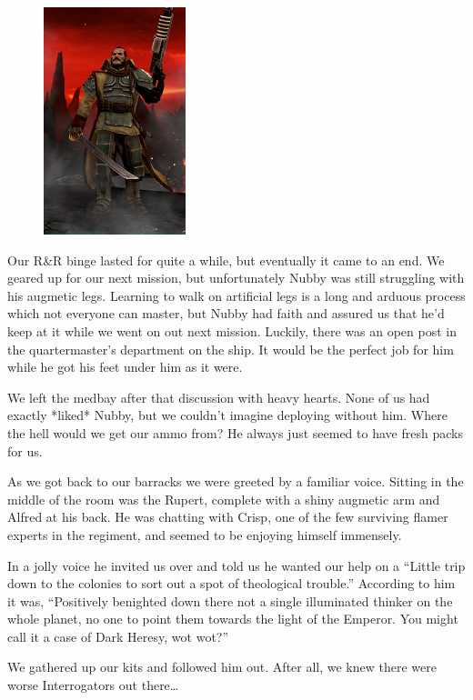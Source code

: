 \begin{figure}
	\begin{center}
		\includegraphics[width=\figwidth]{pics/5/44.png}
	\end{center}
\end{figure}
Our R\&R binge lasted for quite a while, but eventually it came to an end. 
We geared up for our next mission, but unfortunately Nubby was still struggling with his augmetic legs. 
Learning to walk on artificial legs is a long and arduous process which not everyone can master, but Nubby had faith and assured us that he’d keep at it while we went on out next mission. 
Luckily, there was an open post in the quartermaster’s department on the ship. 
It would be the perfect job for him while he got his feet under him as it were.

We left the medbay after that discussion with heavy hearts. 
None of us had exactly *liked* Nubby, but we couldn’t imagine deploying without him. 
Where the hell would we get our ammo from? He always just seemed to have fresh packs for us.

As we got back to our barracks we were greeted by a familiar voice. 
Sitting in the middle of the room was the Rupert, complete with a shiny augmetic arm and Alfred at his back. 
He was chatting with Crisp, one of the few surviving flamer experts in the regiment, and seemed to be enjoying himself immensely.

In a jolly voice he invited us over and told us he wanted our help on a “Little trip down to the colonies to sort out a spot of theological trouble.” 
According to him it was, “Positively benighted down there not a single illuminated thinker on the whole planet, no one to point them towards the light of the Emperor. 
You might call it a case of Dark Heresy, wot wot?”

We gathered up our kits and followed him out. 
After all, we knew there were worse Interrogators out there…

